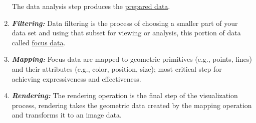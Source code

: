 \begin{enumerate}
\begin{itemize}
  \end{itemize}
  The data analysis step produces the \underline{prepared data}.
  \item \textbf{\textit{Filtering:}} Data filtering is the process of choosing a smaller part of your data set and using that subset for viewing or analysis\cite{WhatDataFiltering}, this portion of data called \underline{focus data}. 
  \item \textbf{\textit{Mapping:}} Focus data are mapped to geometric primitives (e.g., points, lines) and their attributes (e.g., color, position, size); most critical step for achieving expressiveness and effectiveness.
  \item \textbf{\textit{Rendering:}} The rendering operation is the final step of the visualization process, rendering takes the geometric data created by the mapping operation and transforms it to an image data.
  \end{enumerate}
  








